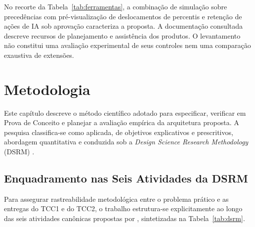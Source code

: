 \documentclass[12pt,openany,oneside,a4paper,english,brazilian,sumario=tradicional]{abntex2}
\begin{document}
\begin{table}[htbp]
\end{table}

No recorte da Tabela~\ref{tab:ferramentas}, a combinação de simulação sobre precedências com pré-visualização de deslocamentos de percentis e retenção de ações de IA sob aprovação caracteriza a proposta. A documentação consultada descreve recursos de planejamento e assistência dos produtos. O levantamento não constitui uma avaliação experimental de seus controles nem uma comparação exaustiva de extensões.

\chapter{Metodologia}\label{cap:metodologia}

Este capítulo descreve o método científico adotado para especificar, verificar em Prova de Conceito e planejar a avaliação empírica da arquitetura proposta. A pesquisa classifica-se como aplicada, de objetivos explicativos e prescritivos, abordagem quantitativa e conduzida sob a \textit{Design Science Research Methodology} (DSRM) \cite{peffers2007}.

\section{Enquadramento nas Seis Atividades da DSRM}\label{sec:dsrm}

Para assegurar rastreabilidade metodológica entre o problema prático e as entregas do TCC1 e do TCC2, o trabalho estrutura-se explicitamente ao longo das seis atividades canônicas propostas por , sintetizadas na Tabela~\ref{tab:dsrm}.
\end{document}
